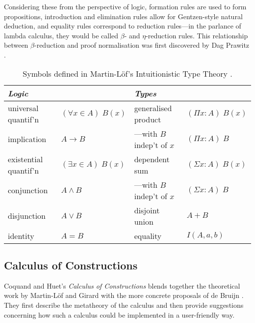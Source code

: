 \documentclass[12pt,toc=bibliography,numbers=noendperiod,
               footnotes=multiple,twoside]{scrartcl}
\begin{document}
Considering these from the perspective of logic, formation rules are used to form propositions, introduction and elimination rules allow for Gentzen-style natural deduction, and equality rules correspond to reduction rules---in the parlance of lambda calculus, they would be called \(\beta\)- and \(\eta\)-reduction rules. This relationship between \(\beta\)-reduction and proof normalisation was first discovered by Dag Prawitz \autocite{prawitz_natural_1965}.

\begin{table}[h]
    \centering
    \begin{tabular}{l l l l}
        \toprule
        \textit{Logic} & & \textit{Types} & \\
        \midrule
	universal quantif'n & \((\forall x \in A)\;B(x)\)
		& generalised product & \((\Pi x : A)\;B(x)\) \\
	implication & \(A \rightarrow B\)
		& ---with \(B\) indep't of \(x\) & \((\Pi x : A)\;B\) \\
	existential quantif'n & \((\exists x \in A)\;B(x)\)
		& dependent sum & \((\Sigma x : A)\;B(x)\) \\
	conjunction & \(A \wedge B\)
		& ---with \(B\) indep't of \(x\) & \((\Sigma x : A)\;B\) \\
	disjunction & \(A \vee B\)
		& disjoint union & \(A + B\) \\
	identity & \(A = B\)
		& equality & \(I(A, a, b)\) \\
	
        \bottomrule
    \end{tabular}
    \caption{Symbols defined in Martin-Löf's Intuitionistic Type Theory \parencite{sambin_intuitionistic_1984}.}
    \label{tab:martin-loef}
\end{table}

\subsection{Calculus of Constructions}

Coquand and Huet's \emph{Calculus of Constructions} blends together the theoretical work by Martin-Löf and Girard with the more concrete proposals of de Bruijn \autocite{coquand_calculus_1988}. They first describe the metatheory of the calculus and then provide suggestions concerning how such a calculus could be implemented in a user-friendly way.
\end{document}
